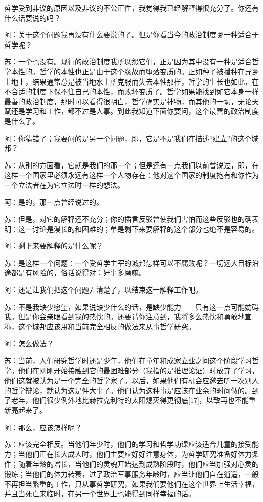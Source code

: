 \documentclass[12pt,oneside]{book}
\begin{document}
哲学受到非议的原因以及非议的不公正性，我觉得我已经解释得很充分了。你还有什么话要说的吗？

阿：关于这个问题我再没有什么要说的了。但是你看当今的政治制度哪一种适合于哲学呢？

苏：一个也没有。现行的政治制度我所以怨它们，正是因为其中没有一种是适合哲学本性的。哲学的本性也正是由于这个缘故而堕落变质的。正如种子被播种在异乡土地上，结果通常总是被当地水土所克服而失去本性那样，哲学的生长也如此，在不合适的制度下保不住自己的本性，而败坏变质了。哲学如果能找到如它本身一样最善的政治制度，那时可以看得很明白，哲学确实是神物，而其他的一切，无论天赋还是学习和工作，都不过是人事。到此我知道下面你要问，这个最善的政治制度是什么了。

阿：你猜错了；我要问的是另一个问题，即，它是不是我们在描述“建立”的这个城邦？

苏：从别的方面看，它就是我们的那一个；但是还有一点我们以前曾说过，即，在这样一个国家里必须永远有这样一个人物存在：他对这个国家的制度抱有和你作为一个立法者在为它立法时一样的想法。

阿：是的，那一点曾经说过的。

苏：但是，对它的解释还不充分；你的插言反驳曾使我们害怕而这些反驳也的确表明：这一讨论是漫长的和困难的；单是剩下来要解释的这个部分也绝不是容易的。

阿：剩下来要解释的是什么呢？

苏：是这样一个问题：一个受哲学主宰的城邦怎样可以不腐败呢？一切远大目标沿途都是有风险的，俗话说得对：好事多磨嘛。

阿：还是让我们把这个问题弄清楚了，以结束这一解释工作吧。

苏：不是我缺少愿望，如果说缺少什么的话，是缺少能力——只有这一点可能妨碍我。但是你会亲眼看到我的热忱的。还要请你注意到，我将多么热忱和勇敢地宣称，这个城邦应该用和当前完全相反的做法来从事哲学研究。

阿：怎么做法？

苏：当前，人们研究哲学时还是少年，他们在童年和成家立业之间这个阶段学习哲学。他们在刚刚开始接触到它的最困难部分（我指的是推理论证）时放弃了学习，他们这就被认为是一个完全的哲学家了。以后，如果他们有机会应邀去听一次别人的哲学辩论，就认为这是件大事了。他们认为这种事是应该在业余的时间做的。到了老年，他们很少例外地比赫拉克利特的太阳熄灭得更彻底[17]，以致再也不能重新亮起来了。

阿：那么，应该怎样呢？

苏：应该完全相反。当他们年少时，他们的学习和哲学功课应该适合儿童的接受能力；当他们正在长大成人时，他们主要应好好注意身体，为哲学研究准备好体力条件；随着年龄的增长，当他们的灵魂开始达到成熟阶段时，他们应当加强对心灵的锻炼；当他们的体力转衰，过了政治军事服务年龄时，应当让他们自在逍遥，一般不再担当繁重的工作，只从事哲学研究，如果我们要他们在这个世界上生活幸福，并且当死亡来临时，在另一个世界上也能得到同样幸福的话。
\end{document}
